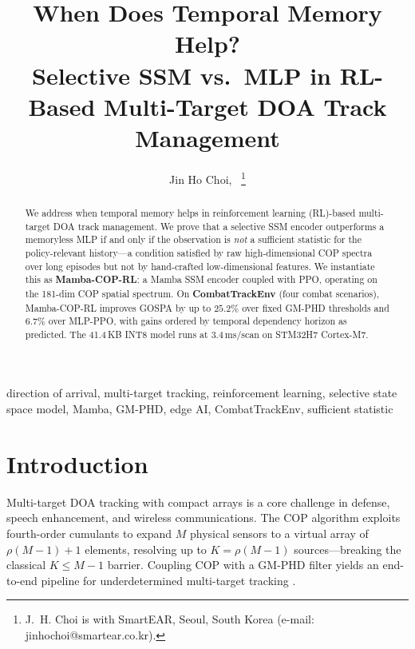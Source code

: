 \documentclass[journal]{IEEEtran}
\begin{document}
\title{When Does Temporal Memory Help?\\
Selective SSM vs.\ MLP in RL-Based Multi-Target DOA Track Management}

\author{Jin Ho Choi,~%
  \thanks{J.~H. Choi is with SmartEAR, Seoul, South Korea
          (e-mail: jinhochoi@smartear.co.kr).}%
}


\maketitle

\begin{abstract}
We address when temporal memory helps in reinforcement learning
(RL)-based multi-target DOA track management.
We prove that a selective SSM encoder outperforms a memoryless MLP
if and only if the observation is \emph{not} a sufficient statistic
for the policy-relevant history---a condition satisfied by raw
high-dimensional COP spectra over long episodes but not by
hand-crafted low-dimensional features.
We instantiate this as \textbf{Mamba-COP-RL}: a Mamba SSM encoder
coupled with PPO, operating on the 181-dim COP spatial spectrum.
On \textbf{CombatTrackEnv} (four combat scenarios), Mamba-COP-RL
improves GOSPA by up to $25.2\%$ over fixed GM-PHD thresholds and
$6.7\%$ over MLP-PPO, with gains ordered by temporal dependency
horizon as predicted.
The 41.4\,KB INT8 model runs at $3.4$\,ms/scan on STM32H7 Cortex-M7.
\end{abstract}

\begin{IEEEkeywords}
direction of arrival, multi-target tracking, reinforcement learning,
selective state space model, Mamba, GM-PHD, edge AI, CombatTrackEnv,
sufficient statistic
\end{IEEEkeywords}


\section{Introduction}
\label{sec:intro}

Multi-target DOA tracking with compact arrays is a core challenge
in defense, speech enhancement, and wireless communications.
The COP algorithm \cite{choi2015underdetermined} exploits
fourth-order cumulants to expand $M$ physical sensors to a virtual
array of $\rho(M{-}1){+}1$ elements, resolving up to $K{=}\rho(M{-}1)$
sources---breaking the classical $K \leq M{-}1$ barrier.
Coupling COP with a GM-PHD filter \cite{vo2006gaussian} yields an
end-to-end pipeline for underdetermined multi-target
tracking \cite{choi2026irondome}.
\end{document}
